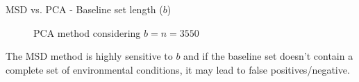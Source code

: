 \begin{frame}{MSD vs. PCA - Baseline set length ($b$)}
\begin{figure}[H]
{            \caption{PCA method considering $b = n = 3550$}
        }
    \end{figure}

    \vspace{-9pt}

    The MSD method is highly sensitive to $b$ and if the baseline set doesn't contain a complete set of environmental conditions, it may lead to false positives/negative.

\end{frame}



